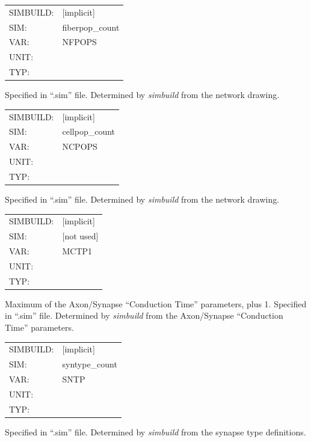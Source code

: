 \documentclass[12pt,openany,oneside]{book}
\newcommand{\prog}[1]{\textit{{#1}}}
\newcommand{\ext}[1]{{{``.#1''}}}
\newcommand{\inquotes}[1]{{{``#1''}}}
\begin{document}
\begin{flushleft}
\begin{tabular}{@{}ll@{}}
SIMBUILD: & [implicit]\\
SIM: & fiberpop\_count\\
VAR: & NFPOPS\\
UNIT: &\\
TYP: &\\
\end{tabular}
\end{flushleft}
\noindent
Specified in \ext{sim} file. Determined by \prog{simbuild} from the network
drawing.
\filbreak
\vspace{\baselineskip}

\begin{flushleft}
\begin{tabular}{@{}ll@{}}
SIMBUILD: & [implicit]\\
SIM: & cellpop\_count\\
VAR: & NCPOPS\\
UNIT: &\\
TYP: &\\
\end{tabular}
\end{flushleft}
\noindent
Specified in \ext{sim} file. Determined by \prog{simbuild} from the network
drawing.
\filbreak
\vspace{\baselineskip}

\begin{flushleft}
\begin{tabular}{@{}ll@{}}
SIMBUILD: & [implicit]\\
SIM: & [not used]\\
VAR: & MCTP1\\
UNIT: &\\
TYP: &\\
\end{tabular}
\end{flushleft}
\noindent
Maximum of the Axon/Synapse \inquotes{Conduction Time} parameters, plus 1.
Specified in \ext{sim} file. Determined by \prog{simbuild} from the
Axon/Synapse \inquotes{Conduction Time} parameters.
\filbreak
\vspace{\baselineskip}

\begin{flushleft}
\begin{tabular}{@{}ll@{}}
SIMBUILD: & [implicit]\\
SIM: & syntype\_count\\
VAR: & SNTP\\
UNIT: &\\
TYP: &\\
\end{tabular}
\end{flushleft}
\noindent
Specified in \ext{sim} file. Determined by \prog{simbuild} from the synapse
type definitions.
\filbreak
\vspace{\baselineskip}
\end{document}
